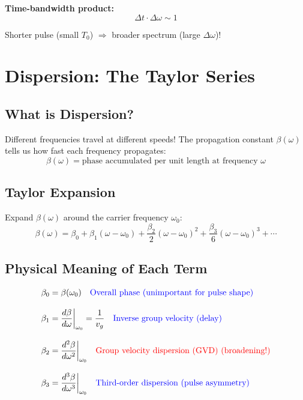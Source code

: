 \documentclass[12pt]{article}
\begin{document}
\textbf{Time-bandwidth product:}
$$\Delta t \cdot \Delta \omega \sim 1$$

Shorter pulse (small $T_0$) $\Rightarrow$ broader spectrum (large $\Delta\omega$)!

\section{Dispersion: The Taylor Series}

\subsection{What is Dispersion?}

Different frequencies travel at different speeds!
The propagation constant $\beta(\omega)$ tells us how fast each frequency propagates:
\begin{equation}
\beta(\omega) = \text{phase accumulated per unit length at frequency } \omega
\end{equation}

\subsection{Taylor Expansion}

Expand $\beta(\omega)$ around the carrier frequency $\omega_0$:
\begin{equation}
\boxed{\beta(\omega) = \beta_0 + \beta_1(\omega - \omega_0) + \frac{\beta_2}{2}(\omega - \omega_0)^2 + \frac{\beta_3}{6}(\omega - \omega_0)^3 + \cdots}
\end{equation}

\subsection{Physical Meaning of Each Term}

\begin{align}
\beta_0 &= \beta(\omega_0) \quad \text{\textcolor{blue}{Overall phase (unimportant for pulse shape)}} \\[0.3cm]
\beta_1 &= \frac{d\beta}{d\omega}\bigg|_{\omega_0} = \frac{1}{v_g} \quad \text{\textcolor{blue}{Inverse group velocity (delay)}} \\[0.3cm]
\beta_2 &= \frac{d^2\beta}{d\omega^2}\bigg|_{\omega_0} \quad \text{\textcolor{red}{Group velocity dispersion (GVD) (broadening!)}} \\[0.3cm]
\beta_3 &= \frac{d^3\beta}{d\omega^3}\bigg|_{\omega_0} \quad \text{\textcolor{blue}{Third-order dispersion (pulse asymmetry)}}
\end{align}
\end{document}
